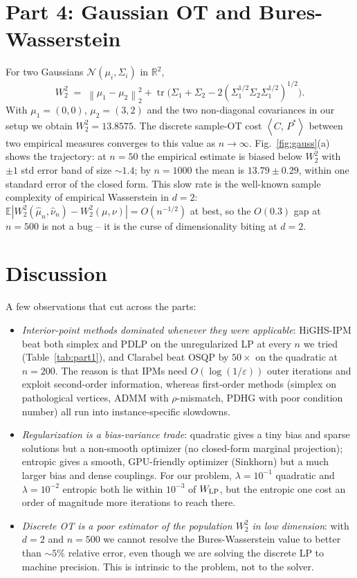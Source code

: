 \documentclass[11pt]{article}
\newcommand{\R}{\mathbb{R}}
\newcommand{\E}{\mathbb{E}}
\newcommand{\inner}[2]{\left\langle #1,\,#2 \right\rangle}
\newcommand{\norm}[1]{\left\lVert #1 \right\rVert}
\DeclareMathOperator{\tr}{tr}
\begin{document}
\section{Part 4: Gaussian OT and Bures-Wasserstein}
For two Gaussians $\mathcal{N}(\mu_i,\Sigma_i)$ in $\R^2$,
\begin{equation}\label{eq:bures}
W_2^2 \;=\; \norm{\mu_1-\mu_2}_2^2 + \tr\!\bigl(\Sigma_1+\Sigma_2
   - 2(\Sigma_1^{1/2}\Sigma_2\Sigma_1^{1/2})^{1/2}\bigr).
\end{equation}
With $\mu_1{=}(0,0)$, $\mu_2{=}(3,2)$ and the two non-diagonal covariances
in our setup we obtain $W_2^2 = 13.8575$. The discrete sample-OT cost
$\inner{C}{P^*}$ between two empirical measures converges to this value as
$n\to\infty$. Fig.~\ref{fig:gauss}(a) shows the trajectory: at $n{=}50$ the
empirical estimate is biased below $W_2^2$ with $\pm 1$ std error band of
size $\sim 1.4$; by $n{=}1000$ the mean is $13.79\pm 0.29$, within one
standard error of the closed form. This slow rate is the well-known
sample complexity of empirical Wasserstein in $d{=}2$:
$\E|W_2^2(\hat\mu_n,\hat\nu_n)-W_2^2(\mu,\nu)|=O(n^{-1/2})$ at best,
so the $O(0.3)$ gap at $n{=}500$ is not a bug -- it is the curse of
dimensionality biting at $d{=}2$.

\section{Discussion}
A few observations that cut across the parts:

\begin{itemize}\itemsep -2pt
  \item \emph{Interior-point methods dominated whenever they were applicable}:
        HiGHS-IPM beat both simplex and PDLP on the unregularized LP at every
        $n$ we tried (Table~\ref{tab:part1}), and Clarabel beat OSQP by
        $50\times$ on the quadratic at $n{=}200$. The reason is that IPMs need
        $O(\log(1/\varepsilon))$ outer iterations and exploit second-order
        information, whereas first-order methods (simplex on pathological
        vertices, ADMM with $\rho$-mismatch, PDHG with poor condition number)
        all run into instance-specific slowdowns.
  \item \emph{Regularization is a bias-variance trade}: quadratic gives a tiny
        bias and sparse solutions but a non-smooth optimizer (no closed-form
        marginal projection); entropic gives a smooth, GPU-friendly optimizer
        (Sinkhorn) but a much larger bias and dense couplings. For our
        problem, $\lambda{=}10^{-1}$ quadratic and $\lambda{=}10^{-2}$
        entropic both lie within $10^{-3}$ of $W_{\rm LP}$, but the entropic
        one cost an order of magnitude more iterations to reach there.
  \item \emph{Discrete OT is a poor estimator of the population $W_2^2$ in
        low dimension}: with $d{=}2$ and $n{=}500$ we cannot resolve the
        Bures-Wasserstein value to better than $\sim 5\%$ relative error,
        even though we are solving the discrete LP to machine precision.
        This is intrinsic to the problem, not to the solver.
\end{itemize}
\end{document}

